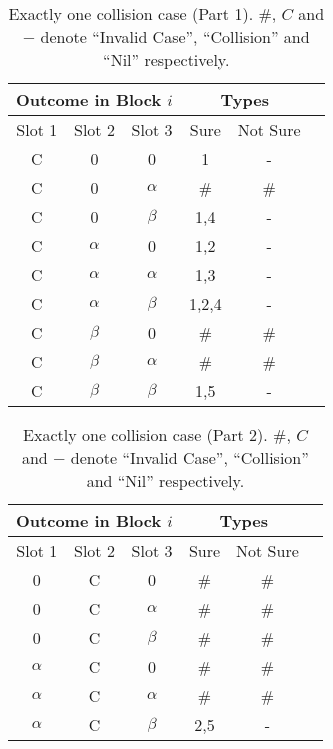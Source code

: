 \documentclass[fleqn]{article}
\begin{document}
\begin {table} 
\centering
\begin{tabular}{|c|c|c|c|c|c|} 
\hline
\multicolumn{3}{|c|}{Outcome in Block $i$} & \multicolumn{2}{c|}{Types} \\ \hline
Slot 1      & Slot 2        & Slot 3       & Sure    & Not Sure         \\ \hline
C           & 0             & 0            & 1       & -                \\ \hline
C           & 0             & $\alpha$     & \#      & \#               \\ \hline
C           & 0             & $\beta$      & 1,4     & -                \\ \hline
C           & $\alpha$      & 0            & 1,2     & -                \\ \hline
C           & $\alpha$      & $\alpha$     & 1,3     & -                \\ \hline
C           & $\alpha$      & $\beta$      & 1,2,4   & -                \\ \hline
C           & $\beta$       & 0            & \#      & \#               \\ \hline
C           & $\beta$       & $\alpha$     & \#      & \#               \\ \hline
C           & $\beta$       & $\beta$      & 1,5       & -   \\ \hline
\hline
\end{tabular}
\caption{Exactly one collision case (Part 1). \#, $C$ and $-$ denote ``Invalid Case'', ``Collision'' and  ``Nil'' respectively.}
\label{Tab_OneC1}
\end{table}

\begin {table} 
\centering
\begin{tabular}{|c|c|c|c|c|c|} 
\hline
\multicolumn{3}{|c|}{Outcome in Block $i$} & \multicolumn{2}{c|}{Types} \\ \hline
Slot 1        & Slot 2      & Slot 3       & Sure       & Not Sure      \\ \hline
0             & C           & 0            & \#         & \#            \\ \hline
0             & C           & $\alpha$     & \#         & \#            \\ \hline
0             & C           & $\beta$      & \#         & \#            \\ \hline
$\alpha$      & C           & 0            & \#         & \#            \\ \hline
$\alpha$      & C           & $\alpha$     & \#         & \#            \\ \hline
$\alpha$      & C           & $\beta$      & 2,5        & -             \\ \hline


\end{tabular}
\caption{Exactly one collision case (Part 2). \#, $C$ and $-$ denote ``Invalid Case'', ``Collision'' and  ``Nil'' respectively.}
\label{Tab_OneC2}
\end{table}
\end{document}
